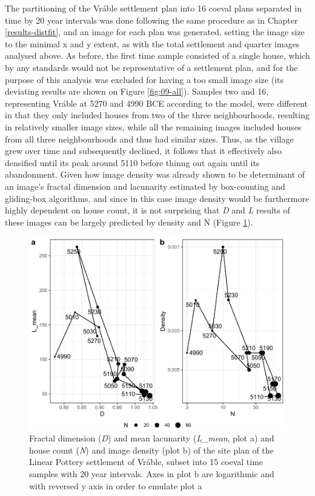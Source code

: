 \documentclass[
  12pt,
]{book}
\begin{document}
The partitioning of the Vráble settlement plan into 16 coeval plans separated in time by 20 year intervals was done following the same procedure as in Chapter \ref{results-distfit}, and an image for each plan was generated, setting the image size to the minimal x and y extent, as with the total settlement and quarter images analysed above. As before, the first time sample consisted of a single house, which by any standards would not be representative of a settlement plan, and for the purpose of this analysis was excluded for having a too small image size (its deviating results are shown on Figure \ref{fig:09-all}). Samples two and 16, representing Vráble at 5270 and 4990 BCE according to the model, were different in that they only included houses from two of the three neighbourhoods, resulting in relatively smaller image sizes, while all the remaining images included houses from all three neighbourhoods and thus had similar sizes. Thus, as the village grew over time and subsequently declined, it follows that it effectively also densified until its peak around 5110 before thinng out again until its abandonment. Given how image density was already shown to be determinant of an image's fractal dimension and lacunarity estimated by box-counting and gliding-box algorithms, and since in this case image density would be furthermore highly dependent on house count, it is not surprising that \emph{D} and \emph{L} results of these images can be largely predicted by density and N (Figure \ref{fig:09-time-points}).



\begin{figure}

{\centering \includegraphics[width=0.9\linewidth]{bookdown-demo_files/figure-latex/09-time-points-1} 

}

\caption{Fractal dimension (\emph{D}) and mean lacunarity (\emph{L\_mean}, plot a) and house count (\emph{N}) and image density (plot b) of the site plan of the Linear Pottery settlement of Vráble, subset into 15 coeval time samples with 20 year intervals. Axes in plot b are logarithmic and with reversed y axis in order to emulate plot a}\label{fig:09-time-points}
\end{figure}
\end{document}
